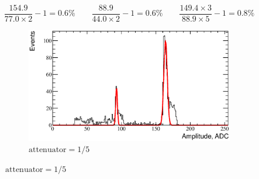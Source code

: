 \documentclass[a4paper,12pt]{article}
\begin{document}
\begin{equation}
\frac{154.9}{77.0 \times 2} - 1 = 0.6\%
\qquad
\frac{88.9}{44.0 \times 2} - 1 = 0.6\%
\qquad
\frac{149.4 \times 3}{88.9 \times 5} - 1 = 0.8\%
\end{equation}


\begin{figure}[htb]
\centering
\begin{subfigure}[t]{0.49\textwidth}
\includegraphics[width=\textwidth]{gfx/atten_1_over_5_ch06.eps}
\caption{$\text{attenuator}=1/5$}
\label{fig:atten_distrib_nominal}
\end{subfigure}


\end{figure}
\end{document}
